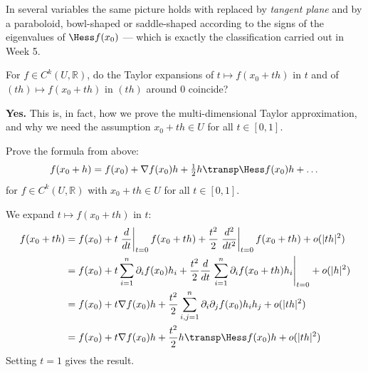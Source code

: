 In several variables the same picture holds with  replaced by \emph{tangent
plane} and  by a paraboloid, bowl-shaped or saddle-shaped according to the
signs of the eigenvalues of $\Hess f(x_0)$ --- which is exactly the classification carried out
in Week 5.

\begin{question}
For $f \in C^k(U, \mathbb{R})$, do the Taylor expansions of $t \mapsto f(x_0+th)$ in $t$ and of
$(th) \mapsto f(x_0+th)$ in $(th)$ around $0$ coincide?
\end{question}

\begin{answer}
\textbf{Yes.} This is, in fact, how we prove the multi-dimensional Taylor approximation, and why
we need the assumption $x_0 + th \in U$ for all $t \in [0,1]$.
\end{answer}

\begin{exercise}
\label{ex:hessian_taylor_proof}
Prove the formula from above:
\[f(x_0+h) = f(x_0) + \nabla f(x_0)h + \tfrac{1}{2}h\transp \Hess f(x_0)h + \dots\]
for $f \in C^k(U,\mathbb{R})$ with $x_0 + th \in U$ for all $t \in [0,1]$.
\end{exercise}

\begin{exercisesolution}
We expand $t \mapsto f(x_0+th)$ in $t$:
\[
\begin{aligned}
f(x_0+th) &= f(x_0) + t\left.\frac{d}{dt}\right|_{t=0}f(x_0+th) + \frac{t^2}{2}\left.\frac{d^2}{dt^2}\right|_{t=0}f(x_0+th) + o(|th|^2) \\
&= f(x_0) + t\sum_{i=1}^{n}\partial_i f(x_0)h_i + \frac{t^2}{2}\frac{d}{dt}\left.\sum_{i=1}^{n}\partial_i f(x_0+th)h_i\right|_{t=0} + o(|h|^2) \\
&= f(x_0) + t\nabla f(x_0)h + \frac{t^2}{2}\sum_{i,j=1}^{n}\partial_i\partial_j f(x_0)h_ih_j + o(|th|^2) \\
&= f(x_0) + t\nabla f(x_0)h + \frac{t^2}{2}h\transp \Hess f(x_0)h + o(|th|^2)
\end{aligned}
\]
Setting $t = 1$ gives the result.
\end{exercisesolution}

